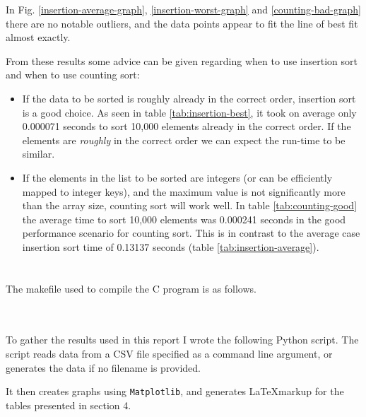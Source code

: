 \documentclass{article}
\begin{document}
In Fig. \ref{insertion-average-graph}, \ref{insertion-worst-graph} and \ref{counting-bad-graph} there are no notable outliers, and the data points appear to fit the line of best fit almost exactly.

From these results some advice can be given regarding when to use insertion sort and when to use counting sort:

\begin{itemize}

\item{
If the data to be sorted is roughly already in the correct order, insertion sort is a good choice. As seen in table \ref{tab:insertion-best}, it took on average only 0.000071 seconds to sort 10,000 elements already in the correct order. If the elements are \textit{roughly} in the correct order we can expect the run-time to be similar.
}

\item{
If the elements in the list to be sorted are integers (or can be efficiently mapped to integer keys), and the maximum value is not significantly more than the array size, counting sort will work well. In table \ref{tab:counting-good} the average time to sort 10,000 elements was 0.000241 seconds in the good performance scenario for counting sort. This is in contrast to the average case insertion sort time of 0.13137 seconds (table \ref{tab:insertion-average}).
}

\end{itemize}

\begin{appendices}

\section{}
The makefile used to compile the C program is as follows.

\inputminted{make}{alg-cw1/Makefile}

\section{}
To gather the results used in this report I wrote the following Python script. The script reads data from a CSV file specified as a command line argument, or generates the data if no filename is provided.

It then creates graphs using \texttt{Matplotlib}, and generates \LaTeX markup for the tables presented in section 4.

\inputminted{python}{alg-cw1/get_results.py}

\end{appendices}
\end{document}
